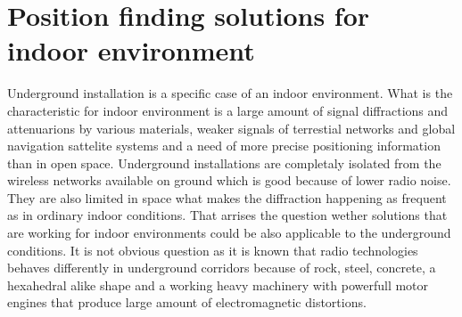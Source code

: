 \documentclass[../main.tex]{subfiles}
\begin{document}
\chapter{Position finding solutions for indoor environment}
\label{chapter:position_finding_solutions}

Underground installation is a specific case of an indoor environment. What is the characteristic for indoor environment is a large amount of signal diffractions and attenuarions by various materials, weaker signals of terrestial networks and global navigation sattelite systems and a need of more precise positioning information than in open space. Underground installations are completaly isolated from the wireless networks available on ground which is good because of lower radio noise. They are also limited in space what makes the diffraction happening as frequent as in ordinary indoor conditions. That arrises the question wether solutions that are working for indoor environments could be also applicable to the underground conditions. It is not obvious question as it is known that radio technologies behaves differently in underground corridors because of rock, steel, concrete, a hexahedral\cite{rf_in_mines_straight_gallery}\cite{rf_in_tunnel_waveguide_effect} alike shape and a working heavy machinery with powerfull motor engines that produce large amount of electromagnetic distortions.
\end{document}
